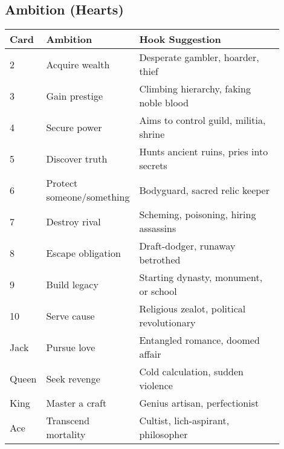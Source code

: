 \documentclass[12pt]{article}
\begin{document}
\subsection*{Ambition (Hearts)}
\begin{longtable}{|p{0.1\linewidth}|p{0.25\linewidth}|p{0.55\linewidth}|}
\hline
\textbf{Card} & \textbf{Ambition} & \textbf{Hook Suggestion} \\
\hline
2 & Acquire wealth & Desperate gambler, hoarder, thief \\
3 & Gain prestige & Climbing hierarchy, faking noble blood \\
4 & Secure power & Aims to control guild, militia, shrine \\
5 & Discover truth & Hunts ancient ruins, pries into secrets \\
6 & Protect someone/something & Bodyguard, sacred relic keeper \\
7 & Destroy rival & Scheming, poisoning, hiring assassins \\
8 & Escape obligation & Draft-dodger, runaway betrothed \\
9 & Build legacy & Starting dynasty, monument, or school \\
10 & Serve cause & Religious zealot, political revolutionary \\
Jack & Pursue love & Entangled romance, doomed affair \\
Queen & Seek revenge & Cold calculation, sudden violence \\
King & Master a craft & Genius artisan, perfectionist \\
Ace & Transcend mortality & Cultist, lich-aspirant, philosopher \\
\hline
\end{longtable}
\end{document}
